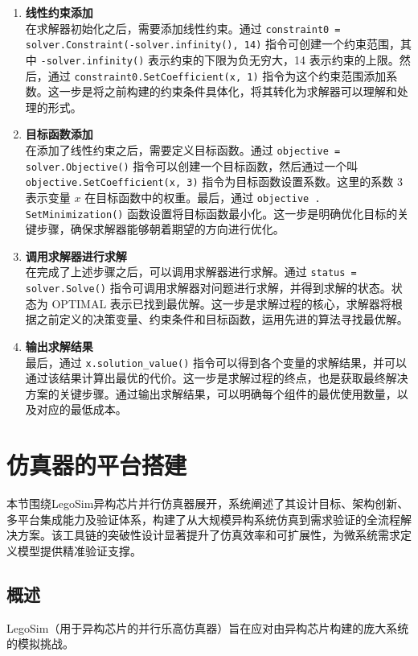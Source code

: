 \documentclass[bachelor]{thesis-uestc}
\begin{document}
\begin{enumerate}
\begin{enumerate}
        \item \textbf{线性约束添加}\\
        在求解器初始化之后，需要添加线性约束。通过 \texttt{constraint0 = solver.Constraint(-solver.infinity(), 14)} 指令可创建一个约束范围，其中 \texttt{-solver.infinity()} 表示约束的下限为负无穷大，14 表示约束的上限。然后，通过 \texttt{constraint0.SetCoefficient(x, 1)} 指令为这个约束范围添加系数。这一步是将之前构建的约束条件具体化，将其转化为求解器可以理解和处理的形式。
        
        \item \textbf{目标函数添加}\\
        在添加了线性约束之后，需要定义目标函数。通过 \texttt{objective = solver.Objective()} 指令可以创建一个目标函数，然后通过一个叫 \texttt{objective.SetCoefficient(x, 3)} 指令为目标函数设置系数。这里的系数 3 表示变量 $x$ 在目标函数中的权重。最后，通过 \texttt{objective . SetMinimization()} 函数设置将目标函数最小化。这一步是明确优化目标的关键步骤，确保求解器能够朝着期望的方向进行优化。
        
        \item \textbf{调用求解器进行求解}\\
        在完成了上述步骤之后，可以调用求解器进行求解。通过 \texttt{status = solver.Solve()} 指令可调用求解器对问题进行求解，并得到求解的状态。状态为 OPTIMAL 表示已找到最优解。这一步是求解过程的核心，求解器将根据之前定义的决策变量、约束条件和目标函数，运用先进的算法寻找最优解。
        
        \item \textbf{输出求解结果}\\
        最后，通过 \texttt{x.solution\_value()} 指令可以得到各个变量的求解结果，并可以通过该结果计算出最优的代价。这一步是求解过程的终点，也是获取最终解决方案的关键步骤。通过输出求解结果，可以明确每个组件的最优使用数量，以及对应的最低成本。
    \end{enumerate}
\end{enumerate}

\section{仿真器的平台搭建}
本节围绕LegoSim异构芯片并行仿真器展开，系统阐述了其设计目标、架构创新、多平台集成能力及验证体系，构建了从大规模异构系统仿真到需求验证的全流程解决方案。该工具链的突破性设计显著提升了仿真效率和可扩展性，为微系统需求定义模型提供精准验证支撑。


\subsection{概述}
LegoSim（用于异构芯片的并行乐高仿真器）旨在应对由异构芯片构建的庞大系统的模拟挑战。
\end{document}
